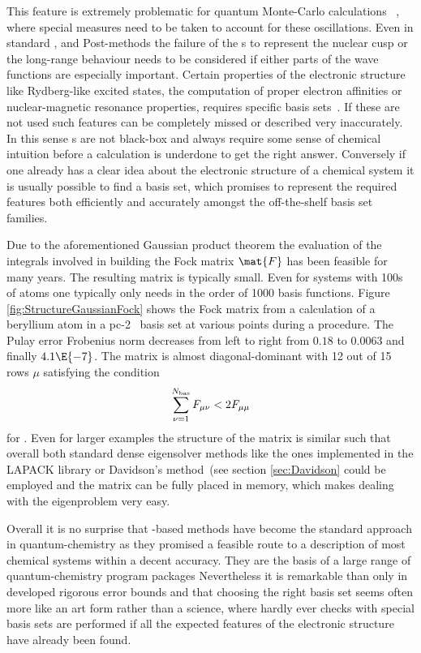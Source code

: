 This feature is extremely problematic for quantum Monte-Carlo calculations%
~\cite{Foulkes2001,Ma2005},
where special measures need to be taken to account for these oscillations.
Even in standard \HF, \DFT and Post-\HF methods
the failure of the {\cGTO}s to represent the nuclear cusp
or the long-range behaviour needs to be considered
if either parts of the wave functions are especially important.
Certain properties of the electronic structure
like Rydberg-like excited states,
the computation of proper electron affinities
or nuclear-magnetic resonance properties,
requires specific basis sets~\cite{Hill2013,Jensen2013}.
If these are not used such features can be completely missed
or described very inaccurately.
In this sense {\cGTO}s are not black-box and
always require some sense of chemical intuition before a calculation is underdone
to get the right answer.
Conversely if one already has a clear idea about the electronic structure
of a chemical system it is usually possible to find a basis set,
which promises to represent the required features both efficiently
and accurately
amongst the off-the-shelf basis set families.

Due to the aforementioned Gaussian product theorem
the evaluation of the integrals involved
in building the Fock matrix $\mat{F}$ has been feasible for many years.
The resulting matrix is typically small.
Even for systems with 100s of atoms one typically only needs
in the order of 1000 basis functions.
Figure \vref{fig:StructureGaussianFock}
shows the Fock matrix from a \SCF calculation of a beryllium atom
in a pc-2~\cite{Jensen2007} basis set
at various points during a \SCF procedure.
The Pulay error Frobenius norm decreases from left to right
from $0.18$ to $0.0063$ and finally $4.1\E{-7}$.
The matrix is almost diagonal-dominant with 12 out of 15 rows $\mu$
satisfying the condition
\[
	\sum_{\nu=1}^{N_\text{bas}} F_{\mu\nu} < 2 F_{\mu\mu}
\]
for .
Even for larger examples the structure of the matrix is similar
such that overall both standard dense eigensolver methods
like the ones implemented in the LAPACK library
or Davidson's method~(see section \vref{sec:Davidson} could be employed
and the matrix can be fully placed in memory,
which makes dealing with the eigenproblem very easy.

Overall it is no surprise that \cGTO-based methods
have become the standard approach in quantum-chemistry
as they promised a feasible route to a description of most chemical
systems within a decent accuracy.
They are the basis of a large range of quantum-chemistry program
packages%
\cite{Ahlrichs1989,ORCA,Hutter2014,Sun2017,Verstraelen2017}
\noindent
Nevertheless it is remarkable than only in \citeyear{Bachmayr2014}
\citet{Bachmayr2014} developed rigorous error bounds
and that choosing the right basis set seems often more like an art form
rather than a science,
where hardly ever checks with special basis sets are performed
if all the expected features of the electronic structure have
already been found.


